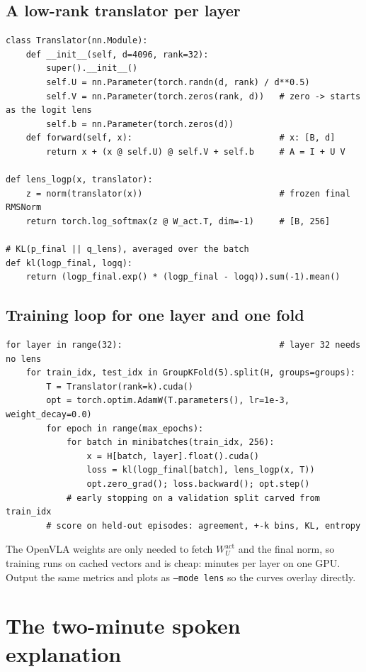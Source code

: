 \documentclass[11pt]{article}
\begin{document}
\subsection{A low-rank translator per layer}
\begin{lstlisting}
class Translator(nn.Module):
    def __init__(self, d=4096, rank=32):
        super().__init__()
        self.U = nn.Parameter(torch.randn(d, rank) / d**0.5)
        self.V = nn.Parameter(torch.zeros(rank, d))   # zero -> starts as the logit lens
        self.b = nn.Parameter(torch.zeros(d))
    def forward(self, x):                             # x: [B, d]
        return x + (x @ self.U) @ self.V + self.b     # A = I + U V

def lens_logp(x, translator):
    z = norm(translator(x))                           # frozen final RMSNorm
    return torch.log_softmax(z @ W_act.T, dim=-1)     # [B, 256]

# KL(p_final || q_lens), averaged over the batch
def kl(logp_final, logq):
    return (logp_final.exp() * (logp_final - logq)).sum(-1).mean()
\end{lstlisting}

\subsection{Training loop for one layer and one fold}
\begin{lstlisting}
for layer in range(32):                               # layer 32 needs no lens
    for train_idx, test_idx in GroupKFold(5).split(H, groups=groups):
        T = Translator(rank=k).cuda()
        opt = torch.optim.AdamW(T.parameters(), lr=1e-3, weight_decay=0.0)
        for epoch in range(max_epochs):
            for batch in minibatches(train_idx, 256):
                x = H[batch, layer].float().cuda()
                loss = kl(logp_final[batch], lens_logp(x, T))
                opt.zero_grad(); loss.backward(); opt.step()
            # early stopping on a validation split carved from train_idx
        # score on held-out episodes: agreement, +-k bins, KL, entropy
\end{lstlisting}
The OpenVLA weights are only needed to fetch $W_U^{\text{act}}$ and the final norm, so training runs on cached vectors and is cheap: minutes per layer on one GPU. Output the same metrics and plots as \texttt{--mode lens} so the curves overlay directly.

\section{The two-minute spoken explanation}
\end{document}
